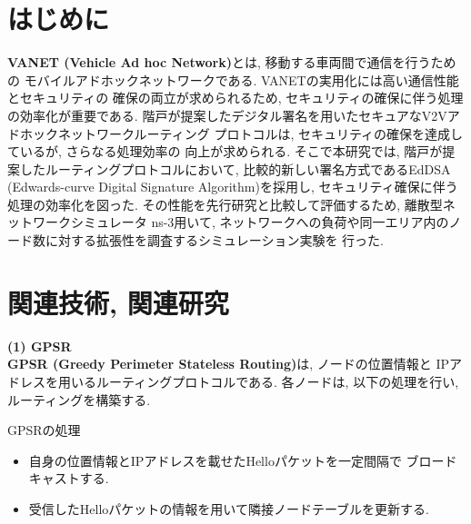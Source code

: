 \documentclass[a4j,9pt,twocolumn]{jsarticle}
\begin{document}
\pagestyle{empty} %

\section{はじめに}
\textbf{VANET (Vehicle Ad hoc Network)}とは, 移動する車両間で通信を行うための
モバイルアドホックネットワークである. VANETの実用化には高い通信性能とセキュリティの
確保の両立が求められるため, セキュリティの確保に伴う処理の効率化が重要である. 
階戸が提案したデジタル署名を用いたセキュアなV2Vアドホックネットワークルーティング
プロトコル\cite{shinato}は, セキュリティの確保を達成しているが, さらなる処理効率の
向上が求められる. そこで本研究では, 階戸が提案したルーティングプロトコルにおいて, 
比較的新しい署名方式であるEdDSA (Edwards-curve Digital Signature Algorithm)を採用し, 
セキュリティ確保に伴う処理の効率化を図った.  
その性能を先行研究と比較して評価するため, 離散型ネットワークシミュレータ ns-3用いて, 
ネットワークへの負荷や同一エリア内のノード数に対する拡張性を調査するシミュレーション実験を
行った. 
\section{関連技術, 関連研究}
\noindent \textbf{(1) GPSR}\\
\indent \textbf{GPSR (Greedy Perimeter Stateless Routing)}\cite{gpsr}は, ノードの位置情報と
IPアドレスを用いるルーティングプロトコルである. 各ノードは, 以下の処理を行い, 
ルーティングを構築する. 
\begin{itembox}[l]{GPSRの処理}
  \begin{itemize}
    \item 自身の位置情報とIPアドレスを載せたHelloパケットを一定間隔で
    ブロードキャストする.
    \item 受信したHelloパケットの情報を用いて隣接ノードテーブルを更新する.
  \end{itemize}
\end{itembox}
\end{document}
